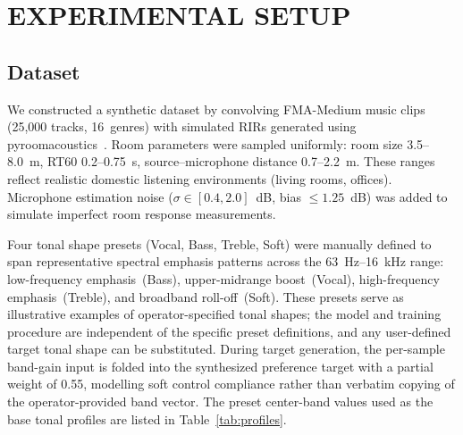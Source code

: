 \documentclass{aes2e}
\begin{document}
\section{EXPERIMENTAL SETUP}

\subsection{Dataset}

We constructed a synthetic dataset by convolving FMA-Medium music
clips~\cite{defferrard2017} (25{,}000 tracks, 16~genres) with simulated RIRs
generated using pyroomacoustics~\cite{scheibler2018}.
Room parameters were sampled uniformly: room size 3.5--8.0~m,
RT60 0.2--0.75~s, source--microphone distance 0.7--2.2~m.
These ranges reflect realistic domestic listening environments (living rooms,
offices).
Microphone estimation noise ($\sigma \in [0.4, 2.0]$~dB, bias $\leq 1.25$~dB)
was added to simulate imperfect room response measurements.

Four tonal shape presets (Vocal, Bass, Treble, Soft) were manually defined to
span representative spectral emphasis patterns across the 63~Hz--16~kHz range:
low-frequency emphasis~(Bass), upper-midrange boost~(Vocal),
high-frequency emphasis~(Treble), and broadband roll-off~(Soft).
These presets serve as illustrative examples of operator-specified tonal shapes;
the model and training procedure are independent of the specific preset
definitions, and any user-defined target tonal shape can be substituted.
During target generation, the per-sample band-gain input is folded into the
synthesized preference target with a partial weight of 0.55, modelling soft
control compliance rather than verbatim copying of the operator-provided
band vector. The preset center-band values used as the base tonal profiles are
listed in Table~\ref{tab:profiles}.

\begin{table}[tp]
  \centering
  \caption{Tonal shape preset center-band gains (dB).
           Frequency bands in Hz.}
  \label{tab:profiles}
\end{table}
\end{document}
